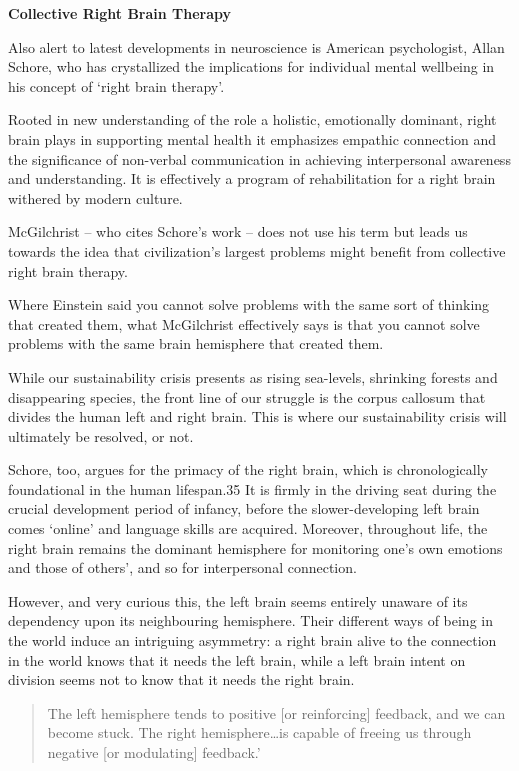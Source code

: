 \documentclass[
]{book}
\begin{document}
\textbf{Collective Right Brain Therapy}

Also alert to latest developments in neuroscience is American psychologist, Allan Schore, who has crystallized the implications for individual mental wellbeing in his concept of `right brain therapy'.

Rooted in new understanding of the role a holistic, emotionally dominant, right brain plays in supporting mental health it emphasizes empathic connection and the significance of non-verbal communication in achieving interpersonal awareness and understanding. It is effectively a program of rehabilitation for a right brain withered by modern culture.

McGilchrist -- who cites Schore's work -- does not use his term but leads us towards the idea that civilization's largest problems might benefit from collective right brain therapy.

Where Einstein said you cannot solve problems with the same sort of thinking that created them, what McGilchrist effectively says is that you cannot solve problems with the same brain hemisphere that created them.

While our sustainability crisis presents as rising sea-levels, shrinking forests and disappearing species, the front line of our struggle is the corpus callosum that divides the human left and right brain. This is where our sustainability crisis will ultimately be resolved, or not.

Schore, too, argues for the primacy of the right brain, which is chronologically foundational in the human lifespan.35 It is firmly in the driving seat during the crucial development period of infancy, before the slower-developing left brain comes `online' and language skills are acquired. Moreover, throughout life, the right brain remains the dominant hemisphere for monitoring one's own emotions and those of others', and so for interpersonal connection.

However, and very curious this, the left brain seems entirely unaware of its dependency upon its neighbouring hemisphere. Their different ways of being in the world induce an intriguing asymmetry: a right brain alive to the connection in the world knows that it needs the left brain, while a left brain intent on division seems not to know that it needs the right brain.

\begin{quote}
The left hemisphere tends to positive {[}or reinforcing{]} feedback, and we can become stuck. The right hemisphere\ldots is capable of freeing us through negative {[}or modulating{]} feedback.'
\end{quote}
\end{document}
